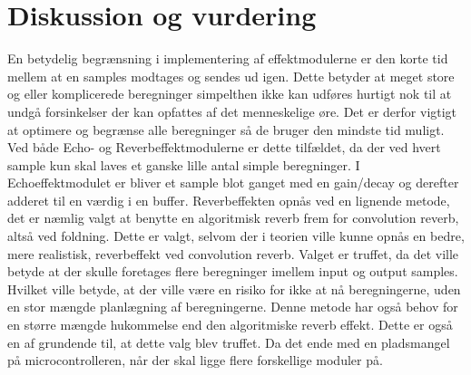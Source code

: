 \chapter{Diskussion og vurdering}\label{kap:diskussion}
\vspace*{.5cm}
 

En betydelig begrænsning i implementering af effektmodulerne er den korte tid mellem at en samples modtages og sendes ud igen.
Dette betyder at  meget store og eller komplicerede beregninger simpelthen ikke kan udføres hurtigt nok til at undgå forsinkelser der kan opfattes af det menneskelige øre.
Det er derfor vigtigt at optimere og begrænse alle beregninger så de bruger den mindste tid muligt. 
Ved både Echo- og Reverbeffektmodulerne er dette tilfældet, da der ved hvert sample kun skal laves et ganske lille antal simple beregninger.
I Echoeffektmodulet er bliver et sample blot ganget med en gain/decay  og derefter adderet til en værdig i en buffer.
Reverbeffekten opnås ved en lignende metode, det er næmlig valgt at benytte en algoritmisk reverb frem for convolution reverb, altså ved foldning.
Dette er valgt, selvom der i teorien ville kunne opnås en bedre, mere realistisk, reverbeffekt ved convolution reverb.
Valget er truffet, da det ville betyde at der skulle foretages flere beregninger imellem input og output samples.
Hvilket ville betyde, at der ville være en risiko for ikke at nå beregningerne, uden en stor mængde planlægning af beregningerne.
Denne metode har også behov for en større mængde hukommelse end den algoritmiske reverb effekt.
Dette er også en af grundende til, at dette valg blev truffet. 
Da det ende med en pladsmangel på microcontrolleren, når der skal ligge flere forskellige moduler på.
